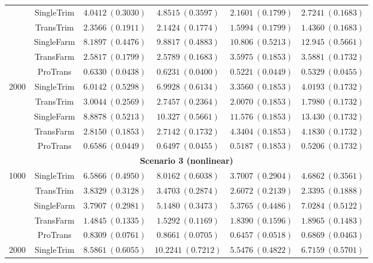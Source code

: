 \documentclass[12pt]{article}
\begin{document}
\begin{table}[!ht]
\begin{tabular}{cccccc}
        & SingleTrim  & $4.0412\ (0.3030)$ & $4.8515\ (0.3597)$ & $2.1601\ (0.1799)$ & $2.7241\ (0.1683)$ \\
        & TransTrim  & $2.3566\ (0.1911)$ & $2.1424\ (0.1774)$ & $1.5994\ (0.1799)$ & $1.4360\ (0.1683)$\\
        & SingleFarm  & $8.1897\ (0.4476)$ & $9.8817\ (0.4883)$ & $10.806\ (0.5213)$ & $12.945\ (0.5661)$\\
        & TransFarm  & $2.5817\ (0.1799)$ & $2.5789\ (0.1683)$ & $3.5975\ (0.1853)$ & $3.5881\ (0.1732)$\\
        & ProTrans  & $\bm{0.6330}\ (0.0438)$ & $\bm{0.6231}\ (0.0400)$ & $\bm{0.5221}\ (0.0449)$ & $\bm{0.5329}\ (0.0455)$\\
        \hline
        \multirow{5}{*}{2000} 
        & SingleTrim  & $6.0142\ (0.5298)$ & $6.9928\ (0.6134)$ & $3.3560\ (0.1853)$ & $4.0193\ (0.1732)$ \\
        & TransTrim  & $3.0044\ (0.2569)$ & $2.7457\ (0.2364)$ & $2.0070\ (0.1853)$ & $1.7980\ (0.1732)$\\
        & SingleFarm   & $8.8878\ (0.5213)$ & $10.327\ (0.5661)$ & $11.576\ (0.1853)$ & $13.430\ (0.1732)$\\
        & TransFarm   & $2.8150\ (0.1853)$ & $2.7142\ (0.1732)$ & $4.3404\ (0.1853)$ & $4.1830\ (0.1732)$\\
        & ProTrans   & $\bm{0.6586}\ (0.0449)$ & $\bm{0.6497}\ (0.0455)$ & $\bm{0.5187}\ (0.1853)$ & $\bm{0.5206}\ (0.1732)$\\
        \hline
         \multicolumn{6}{c}{\textbf{Scenario 3 (nonlinear)}}\\
         \hline
        \multirow{5}{*}{1000} 
        & SingleTrim  & $6.5866\ (0.4950)$ &  $8.0162\ (0.6038)$  & $3.7007\ (0.2904)$& $4.6862\ (0.3561)$ \\
        & TransTrim  & $3.8329\ (0.3128)$& $3.4703\ (0.2874)$  & $2.6072\ (0.2139)$ & $2.3395\ (0.1888)$ \\
        & SingleFarm   & $3.7907\ (0.2981)$  & $5.1480\ (0.3473)$ & $5.3765\ (0.4486)$& $7.0284\ (0.5122)$ \\
        & TransFarm   & $1.4845\ (0.1335)$  & $1.5292\ (0.1169)$  & $1.8390\ (0.1596)$ & $1.8965\ (0.1483)$ \\
        & ProTrans    & $\bm{0.8309}\ (0.0761)$  & $\bm{0.8661}\ (0.0705)$  & $\bm{0.6457}\ (0.0518)$ & $\bm{0.6869}\ (0.0463)$ \\
        \hline
        \multirow{5}{*}{2000} 
        & SingleTrim  & $8.5861\ (0.6055)$  & $10.2241\ (0.7212)$  & $5.5476\ (0.4822)$ & $6.7159\ (0.5701)$ \\

\end{tabular}
\end{table}
\end{document}
